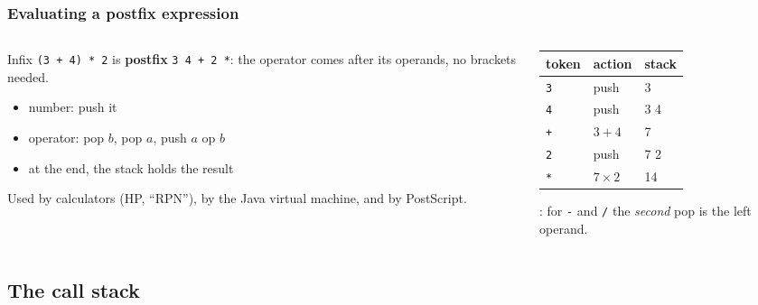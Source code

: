 \documentclass[aspectratio=169,10pt,compress]{beamer}
\begin{document}
\begin{frame}[t,fragile] \frametitle{Evaluating a postfix expression}
  \begin{columns}[T]
    \begin{column}{0.48\textwidth}
      Infix \texttt{(3 + 4) * 2} is \textbf{postfix} \texttt{3 4 + 2 *}: the operator comes after its operands, no brackets needed.
      \begin{itemize}\small
        \item number: push it
        \item operator: pop $b$, pop $a$, push $a \text{ op } b$
        \item at the end, the stack holds the result
      \end{itemize}
      \small Used by calculators (HP, ``RPN''), by the Java virtual machine, and by PostScript.
    \end{column}
    \begin{column}{0.48\textwidth}
      \begin{center}\small
      \begin{tabular}{lll}
        \toprule
        \textbf{token} & \textbf{action}     & \textbf{stack} \\
        \midrule
        \texttt{3}     & push                & 3 \\
        \texttt{4}     & push                & 3 4 \\
        \texttt{+}     & $3 + 4$             & 7 \\
        \texttt{2}     & push                & 7 2 \\
        \texttt{*}     & $7 \times 2$        & 14 \\
        \bottomrule
      \end{tabular}
      \end{center}
      \small {}: for \texttt{-} and \texttt{/} the \emph{second} pop is the left operand.
    \end{column}
  \end{columns}
\end{frame}

\subsection[Calls]{The call stack}
\end{document}
